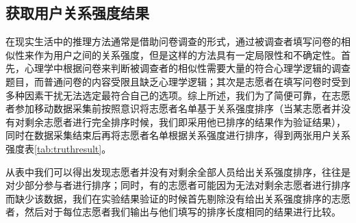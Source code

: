 \subsection{获取用户关系强度结果}
在现实生活中的推理方法通常是借助问卷调查的形式，通过被调查者填写问卷的相似性来作为用户之间的关系强度，但是这样的方法具有一定局限性和不确定性。首先，心理学中根据问卷来判断被调查者的相似性需要大量的符合心理学逻辑的调查题目，而普通问卷的内容受限且缺乏心理学逻辑；其次是志愿者在填写问卷时受到多种因素干扰无法选定最符合自己的选项。综上所述，我们为了简便可靠，在志愿者参加移动数据采集前按照意识将志愿者名单基于关系强度排序（当某志愿者并没有对剩余志愿者进行完全排序时候，我们即采用他已排序的结果作为验证结果），同时在数据采集结束后再将志愿者名单根据关系强度进行排序，得到两张用户关系强度表\ref{tab:truthresult}。
\par 从表中我们可以得出发现志愿者并没有对剩余全部人员给出关系强度排序，往往是对少部分参与者进行排序；同时，有的志愿者可能因为无法对剩余志愿者进行排序而缺少该数据，我们在实验结果验证的时候首先剔除没有给出关系强度排序的志愿者，然后对于每位志愿者我们输出与他们填写的排序长度相同的结果进行比较。
